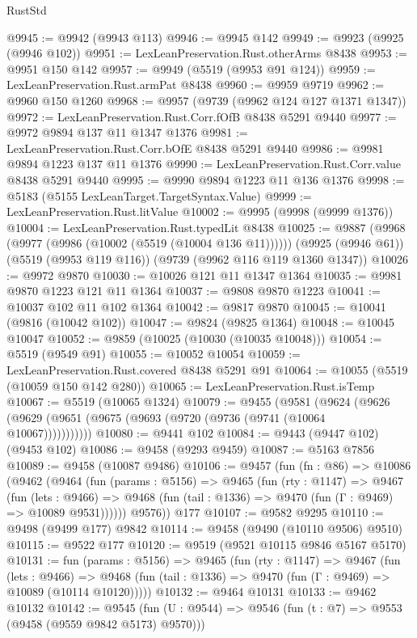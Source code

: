 \begin{lexlean}{RustStd}
\begin{coremodule}
@9945 := @9942 (@9943 @113)
@9946 := @9945 @142
@9949 := @9923 (@9925 (@9946 @102))
@9951 := LexLeanPreservation.Rust.otherArms @8438
@9953 := @9951 @150 @142
@9957 := @9949 (@5519 (@9953 @91 @124))
@9959 := LexLeanPreservation.Rust.armPat @8438
@9960 := @9959 @9719
@9962 := @9960 @150 @1260
@9968 := @9957 (@9739 (@9962 @124 @127 @1371 @1347))
@9972 := LexLeanPreservation.Rust.Corr.fOfB @8438 @5291 @9440
@9977 := @9972 @9894 @137 @11 @1347 @1376
@9981 := LexLeanPreservation.Rust.Corr.bOfE @8438 @5291 @9440
@9986 := @9981 @9894 @1223 @137 @11 @1376
@9990 := LexLeanPreservation.Rust.Corr.value @8438 @5291 @9440
@9995 := @9990 @9894 @1223 @11 @136 @1376
@9998 := @5183 (@5155 LexLeanTarget.TargetSyntax.Value)
@9999 := LexLeanPreservation.Rust.litValue
@10002 := @9995 (@9998 (@9999 @1376))
@10004 := LexLeanPreservation.Rust.typedLit @8438
@10025 := @9887
    (@9968 (@9977 (@9986 (@10002 (@5519 (@10004 @136 @11))))))
    (@9925 (@9946 @61))
    (@5519 (@9953 @119 @116))
    (@9739 (@9962 @116 @119 @1360 @1347))
@10026 := @9972 @9870
@10030 := @10026 @121 @11 @1347 @1364
@10035 := @9981 @9870 @1223 @121 @11 @1364
@10037 := @9808 @9870 @1223
@10041 := @10037 @102 @11 @102 @1364
@10042 := @9817 @9870
@10045 := @10041 (@9816 (@10042 @102))
@10047 := @9824 (@9825 @1364)
@10048 := @10045 @10047
@10052 := @9859 (@10025 (@10030 (@10035 @10048)))
@10054 := @5519 (@9549 @91)
@10055 := @10052 @10054
@10059 := LexLeanPreservation.Rust.covered @8438 @5291 @91
@10064 := @10055 (@5519 (@10059 @150 @142 @280))
@10065 := LexLeanPreservation.Rust.isTemp
@10067 := @5519 (@10065 @1324)
@10079 := @9455
    (@9581 (@9624 (@9626 (@9629 (@9651 (@9675 (@9693 (@9720 (@9736 (@9741 (@10064 @10067)))))))))))
@10080 := @9441 @102
@10084 := @9443 (@9447 @102) (@9453 @102)
@10086 := @9458 (@9293 @9459)
@10087 := @5163 @7856
@10089 := @9458 (@10087 @9486)
@10106 := @9457
    (fun (fn : @86) =>
    @10086
      (@9462
        (@9464
          (fun (params : @5156) =>
          @9465
            (fun (rty : @1147) =>
            @9467
              (fun (lets : @9466) =>
              @9468 (fun (tail : @1336) => @9470 (fun (Γ : @9469) => @10089 @9531))))))
        @9576))
    @177
@10107 := @9582 @9295
@10110 := @9498 (@9499 @177) @9842
@10114 := @9458 (@9490 (@10110 @9506) @9510)
@10115 := @9522 @177
@10120 := @9519 (@9521 @10115 @9846 @5167 @5170)
@10131 := fun (params : @5156) =>
  @9465
    (fun (rty : @1147) =>
    @9467
      (fun (lets : @9466) =>
      @9468 (fun (tail : @1336) => @9470 (fun (Γ : @9469) => @10089 (@10114 @10120)))))
@10132 := @9464 @10131
@10133 := @9462 @10132
@10142 := @9545 (fun (U : @9544) => @9546 (fun (t : @7) => @9553 (@9458 (@9559 @9842 @5173) @9570)))

\end{coremodule}
\end{lexlean}
